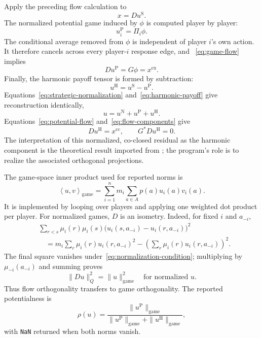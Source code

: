 \documentclass[11pt]{article}
\newcommand{\ip}[2]{\left\langle #1,#2\right\rangle}
\begin{document}
Apply the preceding flow calculation to
\[
 x=Du^{\mathrm S}.
\]
The normalized potential game induced by $\phi$ is computed player by player:
\begin{equation}
 u_i^{\mathrm P}=\Pi_i\phi.
 \label{eq:potential-game}
\end{equation}
The conditional average removed from $\phi$ is independent of player $i$'s
own action.  It therefore cancels across every player-$i$ response edge, and
~\eqref{eq:game-flow} implies
\begin{equation}
 Du^{\mathrm P}=G\phi=x^{\mathrm{ex}}.
 \label{eq:potential-flow}
\end{equation}
Finally, the harmonic payoff tensor is formed by subtraction:
\begin{equation}
 u^{\mathrm H}=u^{\mathrm S}-u^{\mathrm P}.
 \label{eq:harmonic-payoff}
\end{equation}
Equations~\eqref{eq:strategic-normalization} and~\eqref{eq:harmonic-payoff}
give reconstruction identically,
\begin{equation}
 u=u^{\mathrm N}+u^{\mathrm P}+u^{\mathrm H}.
 \label{eq:reconstruction}
\end{equation}
Equations~\eqref{eq:potential-flow} and~\eqref{eq:flow-components} give
\[
 Du^{\mathrm H}=x^{\mathrm{cc}},
 \qquad G^*Du^{\mathrm H}=0.
\]
The interpretation of this normalized, co-closed residual as the harmonic
component is the theoretical result imported from
\cite{candogan2011,abdou2022}; the program's role is to realize the associated
orthogonal projections.

The game-space inner product used for reported norms is
\begin{equation}
 \ip{u}{v}_{\mathrm{game}}
 =\sum_{i=1}^n m_i\sum_{a\in A}p(a)u_i(a)v_i(a).
 \label{eq:game-inner-product}
\end{equation}
It is implemented by looping over players and applying one weighted dot
product per player.  For normalized games, $D$ is an isometry.  Indeed, for
fixed $i$ and $a_{-i}$,
\begin{align*}
 &\sum_{r<s}\mu_i(r)\mu_i(s)
   \bigl(u_i(s,a_{-i})-u_i(r,a_{-i})\bigr)^2\\
 &\quad =m_i\sum_r\mu_i(r)u_i(r,a_{-i})^2
       -\left(\sum_r\mu_i(r)u_i(r,a_{-i})\right)^2.
\end{align*}
The final square vanishes under~\eqref{eq:normalization-condition}; multiplying
by $\mu_{-i}(a_{-i})$ and summing proves
\[
 \|Du\|_Q^2=\|u\|_{\mathrm{game}}^2
 \quad\text{for normalized }u.
\]
Thus flow orthogonality transfers to game orthogonality.  The reported
potentialness is
\begin{equation}
 \rho(u)=
 \frac{\|u^{\mathrm P}\|_{\mathrm{game}}}
 {\|u^{\mathrm P}\|_{\mathrm{game}}+
  \|u^{\mathrm H}\|_{\mathrm{game}}},
 \label{eq:potentialness}
\end{equation}
with \texttt{NaN} returned when both norms vanish.
\end{document}
